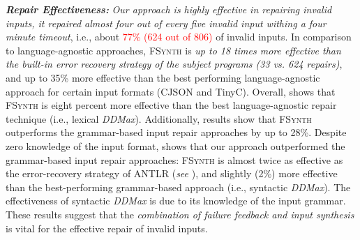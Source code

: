 \documentclass[sigconf,review,anonymous]{acmart}
\newcommand{\recheck}[1]{\textcolor{red}{#1}}
\newcommand{\approach}{\textsc{FSynth}\xspace}
\newcommand{\ddmax}{\textit{DDMax}\xspace}
\begin{document}
\noindent \textbf{\textit{Repair Effectiveness:}} %
\textit{Our approach %
is highly effective in repairing invalid inputs, it repaired almost four out of every five invalid input withing a four minute timeout}, i.e., %
about \recheck{77\% (624 out of 806)} of invalid inputs. In comparison to language-agnostic approaches, %
\approach is \textit{up to 18 times more effective than the built-in error recovery strategy of the subject programs (33 vs. 624 repairs)}, and %
up to 35\% more effective than the best performing language-agnostic approach for certain input formats (CJSON and TinyC). Overall, 
 shows that \approach is eight percent more effective than the best language-agnostic repair technique (i.e., lexical \ddmax). 
Additionally, results show that %
\approach outperforms the %
grammar-based input repair approaches by up to 28\%. 
Despite zero knowledge of the input format, 
shows that %
our approach outperformed the grammar-based input repair approaches: \approach is almost twice as effective as the error-recovery strategy of ANTLR (\textit{see} ), and 
slightly (2\%) more effective than the best-performing grammar-based approach (i.e., syntactic \ddmax). %
The effectiveness of syntactic \ddmax is due to its knowledge of the input grammar. 
These results suggest that %
the \textit{combination of failure feedback and input synthesis} is vital for the effective repair of invalid inputs. 
\end{document}
